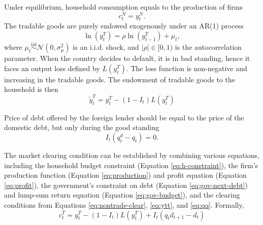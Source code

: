 Under equilibrium, household consumption equals to the production of firms
\begin{equation}
    \label{eq:nontrade-clear}
    c^N_{t} = y^N_t.
\end{equation}
The tradable goods are purely endowed exogenously under an AR(1) process
\begin{equation}
    \ln(y_t^T) = \rho \ln(y^T_{t-1}) + \mu_t,
\end{equation}
where $\mu_t \overset{\mathrm{iid}}{\sim} \mathcal{N}(0,\sigma_\mu^2)$ is an i.i.d. shock, and $ |\rho| \in [0,1)$ is the autocorrelation parameter.
When the country decides to default, it is in bad standing, hence it faces an output loss defined by $L(y^T_t)$. The loss function is non-negative and increasing in the tradable goods. The endowment of tradable goods to the household is then
\begin{equation}
    \label{eq:ytt}
    \tilde{y}^T_t =
        y^T_t  - (1 - I_t) L(y^T_t)
\end{equation}

Price of debt offered by the foreign lender should be equal to the price of the domestic debt, but only during the good standing
\begin{equation}
    \label{eq:qq}
    I_t(q^d_t - q_t) = 0.
\end{equation}

The market clearing condition can be established by combining various equations, including the household budget constraint (Equation \eqref{eq:h-constraint}), the firm's production function (Equation \eqref{eq:production}) and profit equation (Equation \eqref{eq:profit}), the government's constraint on debt (Equation \eqref{eq:gov-next-debt}) and lump-sum return equation (Equation \eqref{eq:gov-budget}), and the clearing conditions from Equations \eqref{eq:nontrade-clear}, \eqref{eq:ytt}, and \eqref{eq:qq}.
Formally,
\begin{equation}
    \label{eq:market-clearing}
    c^T_t = y^T_t - (1 - I_t)L(y^T_t) + I_t(q_t d_{t+1} - d_t)
\end{equation}

